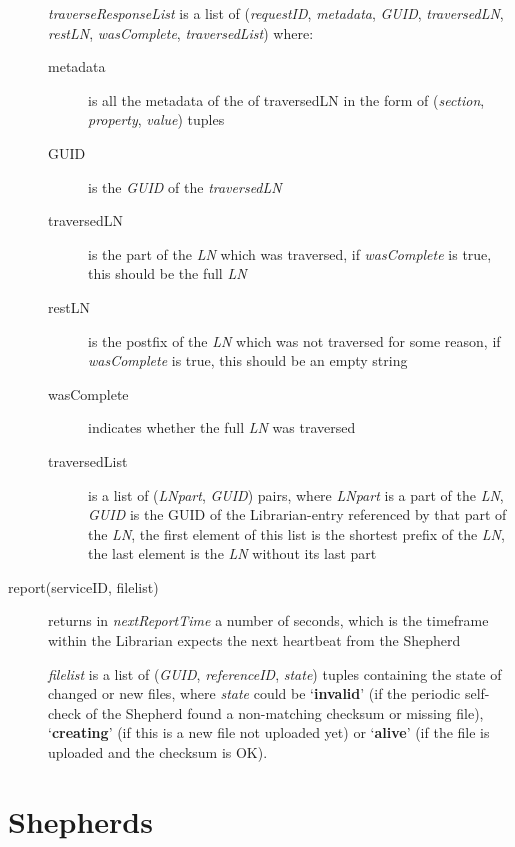 \documentclass{book}
\begin{document}
\begin{description}
    \emph{traverseResponseList} is a list of (\emph{requestID}, \emph{metadata}, \emph{GUID}, \emph{traversedLN}, \emph{restLN}, \emph{wasComplete}, \emph{traversedList}) where:
    \begin{description}
        \item[metadata] is all the metadata of the of traversedLN in the form of (\emph{section}, \emph{property}, \emph{value}) tuples
        \item[GUID] is the \emph{GUID} of the \emph{traversedLN}
        \item[traversedLN] is the part of the \emph{LN} which was traversed, if \emph{wasComplete} is true, this should be the full \emph{LN}
        \item[restLN] is the postfix of the \emph{LN} which was not traversed for some reason, if \emph{wasComplete} is true, this should be an empty string
        \item[wasComplete] indicates whether the full \emph{LN} was traversed
        \item[traversedList] is a list of (\emph{LNpart}, \emph{GUID}) pairs, where \emph{LNpart} is a part of the \emph{LN}, \emph{GUID} is the GUID of the Librarian-entry referenced by that part of the \emph{LN}, the first element of this list is the shortest prefix of the \emph{LN}, the last element is the \emph{LN} without its last part
    \end{description}
    
    \item [report(serviceID, filelist)] returns in \emph{nextReportTime} a number of seconds, which is the timeframe within the Librarian expects the next heartbeat from the Shepherd
    
    \emph{filelist} is a list of (\emph{GUID}, \emph{referenceID}, \emph{state}) tuples containing the state of changed or new files, where \emph{state} could be `\textbf{invalid}' (if the periodic self-check of the Shepherd found a non-matching checksum or missing file), `\textbf{creating}' (if this is a new file not uploaded yet) or `\textbf{alive}' (if the file is uploaded and the checksum is OK).
    
\end{description}



\newpage

\section{Shepherds} %
\label{sec:shepherds}
\end{document}
